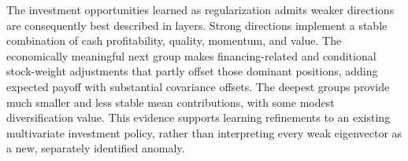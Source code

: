 The investment opportunities learned as regularization admits weaker directions are consequently best described in layers. Strong directions implement a stable combination of cash profitability, quality, momentum, and value. The economically meaningful next group makes financing-related and conditional stock-weight adjustments that partly offset those dominant positions, adding expected payoff with substantial covariance offsets. The deepest groups provide much smaller and less stable mean contributions, with some modest diversification value. This evidence supports learning refinements to an existing multivariate investment policy, rather than interpreting every weak eigenvector as a new, separately identified anomaly.

